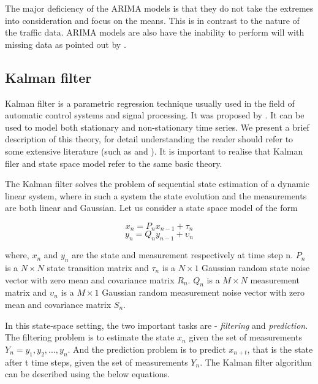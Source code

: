 The major deficiency of the ARIMA models is that they do not take the extremes into
consideration and focus on the means. This is in contrast to the nature of the traffic data.
ARIMA models are also have the inability to perform will with missing data as pointed out by
\citet{smith1997traffic}.


\subsection{Kalman filter}
Kalman filter is a parametric regression technique usually used in the field of automatic control
systems and signal processing. It was proposed by \citet{kalman1960new}. It can be used to model
both stationary and non-stationary time series. We present a brief description of this theory, for
detail understanding the reader should refer to some extensive literature (such as
\citet{harvey1990forecasting}  and \citet{haykin2001kalman}). It is important to realise that Kalman
filer and state space model refer to the same basic theory.


The Kalman filter solves the problem of sequential state estimation of a dynamic linear system, where
in such a system the state evolution and the measurements are both linear and Gaussian. Let us consider
a state space model of the form

        \begin{equation} x_{n} = P_{n}x_{n-1} + \tau_{n} \end{equation}
        \begin{equation} y_{n} = Q_{n}y_{n-1} + \upsilon_{n} \end{equation}

where, $x_{n}$ and $y_{n}$ are the state and measurement respectively at time step n.
$P_{n}$ is a $N \times N$ state transition matrix and $\tau_{n}$ is a $N \times 1$ Gaussian
random state noise vector with zero mean and covariance matrix $R_{n}$. $Q_{n}$ is a $M \times N$
measurement matrix and $\upsilon_{n}$ is a $M \times 1$ Gaussian random measurement noise vector
with zero mean and covariance matrix $S_{n}$.

In this state-space setting, the two important tasks are - \textit{filtering} and \textit{prediction}.
The filtering problem is to estimate the state $x_{n}$ given the set of measurements
$Y_{n} = y_{1}, y_{2},...,y_{n}$. And the prediction problem is to predict $x_{n+t}$, that is the
state after t time steps, given the set of measurements $Y_{n}$. The Kalman filter algorithm can be
described using the below equations.

